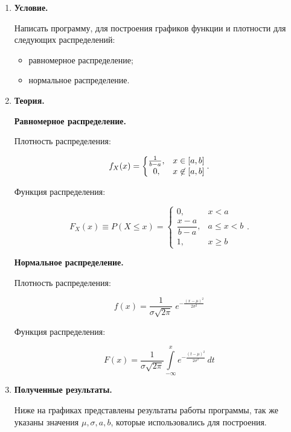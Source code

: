 \documentclass[a4paper,14pt]{extreport} %
\begin{document}
\begin{enumerate}

\item \textbf{Условие. }

Написать программу, для построения графиков функции и плотности для следующих распределений:
\begin{itemize}
\item равномерное распределение;
\item нормальное распределение. 
\end{itemize}

\item \textbf{Теория. }

\textbf{Равномерное распределение. }

Плотность распределения:

\begin{equation*}
f_X(x) = \left\{
\begin{matrix}
{1 \over b-a}, & x\in [a,b] \\
0, & x\not\in [a,b]
\end{matrix}
\right..
\end{equation*}

Функция распределения:

\begin{equation*}
F_X(x) \equiv P(X \le x) = \left\{
\begin{matrix}
0, & x < a \\
\dfrac{x-a}{b-a}, & a \le x < b \\
1, & x \ge b
\end{matrix}
\right..
\end{equation*}

 \textbf{Нормальное распределение. }
 
 Плотность распределения:

\begin{equation*}
 f(x) = \frac{1}{\sigma\sqrt{2\pi}}\; e^{ -\frac{(x-\mu)^2}{2\sigma^2} }
 \end{equation*}
 
 Функция распределения:

\begin{equation*}
 F(x) = \frac 1 {\sigma\sqrt{2\pi}} \int\limits_{-\infty}^{x} e^{ -\frac{(t-\mu)^2}{2\sigma^2}} \, dt
 \end{equation*}
 
\item \textbf{Полученные результаты. }

 Ниже на графиках представлены результаты работы программы, так же указаны значения $\mu, \sigma, a, b$, которые использовались для построения. 


\end{enumerate}
\end{document}
